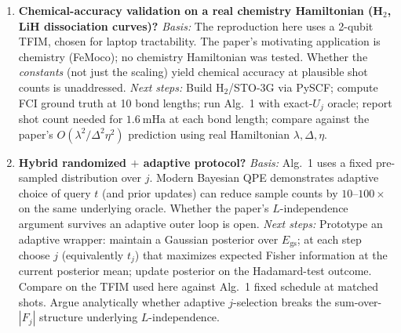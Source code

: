 \begin{enumerate}
\item \textbf{Chemical-accuracy validation on a real chemistry Hamiltonian (H$_2$, LiH
  dissociation curves)?}
  \emph{Basis:} The reproduction here uses a 2-qubit TFIM, chosen for laptop
  tractability. The paper's motivating application is chemistry (FeMoco); no chemistry
  Hamiltonian was tested. Whether the \emph{constants} (not just the scaling) yield
  chemical accuracy at plausible shot counts is unaddressed.
  \emph{Next steps:} Build H$_2$/STO-3G via PySCF; compute FCI ground truth at 10 bond
  lengths; run Alg.~1 with exact-$U_j$ oracle; report shot count needed for
  $1.6~\mathrm{mHa}$ at each bond length; compare against the paper's
  $O(\lambda^2/\Delta^2\eta^2)$ prediction using real Hamiltonian $\lambda,\Delta,\eta$.

\item \textbf{Hybrid randomized $+$ adaptive protocol?}
  \emph{Basis:} Alg.~1 uses a fixed pre-sampled distribution over $j$. Modern Bayesian
  QPE demonstrates adaptive choice of query $t$ (and prior updates) can reduce sample
  counts by $10$--$100\times$ on the same underlying oracle. Whether the paper's
  $L$-independence argument survives an adaptive outer loop is open.
  \emph{Next steps:} Prototype an adaptive wrapper: maintain a Gaussian posterior over
  $E_\text{gs}$; at each step choose $j$ (equivalently $t_j$) that maximizes expected
  Fisher information at the current posterior mean; update posterior on the Hadamard-test
  outcome. Compare on the TFIM used here against Alg.~1 fixed schedule at matched
  shots. Argue analytically whether adaptive $j$-selection breaks the sum-over-$|F_j|$
  structure underlying $L$-independence.
\end{enumerate}
